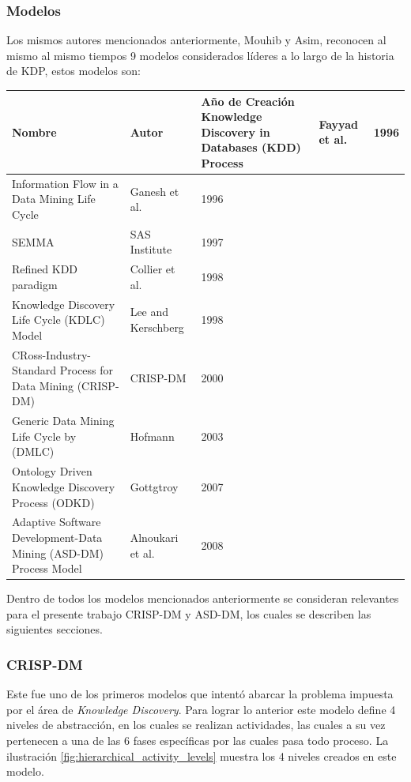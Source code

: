 \subsubsection{Modelos \label{sec:knowledge_discovery_models}}

Los mismos autores mencionados anteriormente, Mouhib y Asim, reconocen al mismo al mismo tiempos 9 modelos considerados líderes a lo largo de la historia de KDP, estos modelos son:

\begin{tabularx}{\linewidth}{@{}Y  Y  Y  Y@{}}
  \caption{Modelos a lo largo de la historia de \textit{KDP}} \label{tab:kdp_models}\\
  \toprule
  Nombre	&	Autor	&	Año de Creación
  \endhead
  \midrule
  Knowledge Discovery in Databases (KDD) Process & Fayyad et al. & 1996 \\
  \midrule
  Information Flow in a Data Mining Life Cycle & Ganesh et al. & 1996 \\
  \midrule
  SEMMA & SAS Institute & 1997 \\
  \midrule
  Refined KDD paradigm & Collier et al. & 1998 \\
  \midrule
  Knowledge Discovery Life Cycle (KDLC) Model & Lee and Kerschberg & 1998 \\
  \midrule
  CRoss-Industry-Standard Process for Data Mining (CRISP-DM) & CRISP-DM & 2000 \\
  \midrule
  Generic Data Mining Life Cycle by (DMLC) & Hofmann & 2003 \\
  \midrule
  Ontology Driven Knowledge Discovery Process (ODKD) & Gottgtroy & 2007 \\
  \midrule
  Adaptive Software Development-Data Mining (ASD-DM) Process Model & Alnoukari et al. & 2008 \\
\end{tabularx}

Dentro de todos los modelos mencionados anteriormente se consideran relevantes para el presente trabajo CRISP-DM y ASD-DM, los cuales se describen las siguientes secciones.

\subsubsection{CRISP-DM \label{crip_dm}}
Este fue uno de los primeros modelos que intentó abarcar la problema impuesta por el área de \textit{Knowledge Discovery}. Para lograr lo anterior este modelo define 4 niveles de abstracción, en los cuales se realizan actividades, las cuales a su vez pertenecen a una de las 6 fases específicas por las cuales pasa todo proceso. La ilustración \ref{fig:hierarchical_activity_levels} muestra los 4 niveles creados en este modelo.

